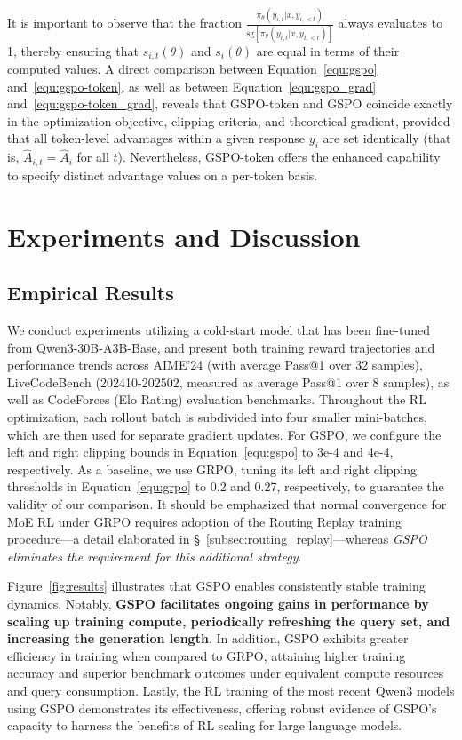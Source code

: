 It is important to observe that the fraction $\frac{ \pi_{\theta} (y_{i,t} | x, y_{i,<t}) }{ \mathrm{sg} \left[ \pi_{\theta} (y_{i,t} | x, y_{i,<t}) \right] }$ always evaluates to 1, thereby ensuring that $s_{i,t}(\theta)$ and $s_{i}(\theta)$ are equal in terms of their computed values. A direct comparison between Equation~\eqref{equ:gspo} and~\eqref{equ:gspo-token}, as well as between Equation~\eqref{equ:gspo_grad} and~\eqref{equ:gspo-token_grad}, reveals that GSPO-token and GSPO coincide exactly in the optimization objective, clipping criteria, and theoretical gradient, provided that all token-level advantages within a given response $y_i$ are set identically (that is, $\widehat{A}_{i,t} = \widehat{A}_{i}$ for all $t$). Nevertheless, GSPO-token offers the enhanced capability to specify distinct advantage values on a per-token basis.

\section{Experiments and Discussion}

\subsection{Empirical Results}

We conduct experiments utilizing a cold-start model that has been fine-tuned from Qwen3-30B-A3B-Base, and present both training reward trajectories and performance trends across AIME'24 (with average Pass@1 over 32 samples), LiveCodeBench (202410-202502, measured as average Pass@1 over 8 samples), as well as CodeForces (Elo Rating) evaluation benchmarks. Throughout the RL optimization, each rollout batch is subdivided into four smaller mini-batches, which are then used for separate gradient updates. For GSPO, we configure the left and right clipping bounds in Equation~\eqref{equ:gspo} to 3e-4 and 4e-4, respectively. As a baseline, we use GRPO, tuning its left and right clipping thresholds in Equation~\eqref{equ:grpo} to 0.2 and 0.27, respectively, to guarantee the validity of our comparison. It should be emphasized that normal convergence for MoE RL under GRPO requires adoption of the Routing Replay training procedure—a detail elaborated in \S~\ref{subsec:routing_replay}—whereas \textit{GSPO eliminates the requirement for this additional strategy}.

Figure~\ref{fig:results} illustrates that GSPO enables consistently stable training dynamics. Notably, \textbf{GSPO facilitates ongoing gains in performance by scaling up training compute, periodically refreshing the query set, and increasing the generation length}. In addition, GSPO exhibits greater efficiency in training when compared to GRPO, attaining higher training accuracy and superior benchmark outcomes under equivalent compute resources and query consumption. Lastly, the RL training of the most recent Qwen3 models using GSPO demonstrates its effectiveness, offering robust evidence of GSPO’s capacity to harness the benefits of RL scaling for large language models.

